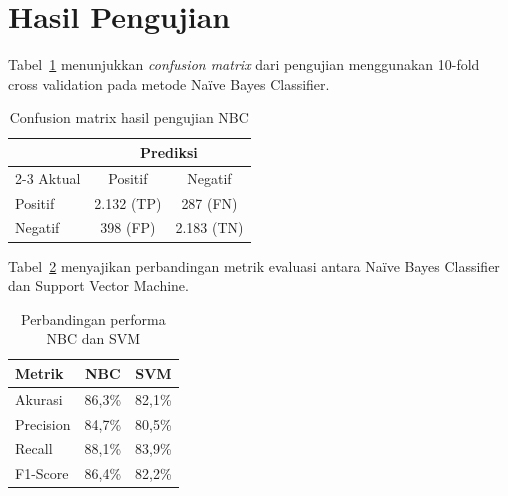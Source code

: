 \section{Hasil Pengujian}

Tabel~\ref{tab:confusion} menunjukkan \emph{confusion matrix} dari pengujian menggunakan 10-fold cross validation pada metode Na\"ive Bayes Classifier.

\begin{table}[H]
\centering
\caption{Confusion matrix hasil pengujian NBC}
\label{tab:confusion}
\begin{tabular}{@{}lcc@{}}
\toprule
 & \multicolumn{2}{c}{Prediksi} \\
\cmidrule{2-3}
Aktual & Positif & Negatif \\
\midrule
Positif & 2.132 (TP) & 287 (FN) \\
Negatif & 398 (FP) & 2.183 (TN) \\
\bottomrule
\end{tabular}
\end{table}

Tabel~\ref{tab:comparison} menyajikan perbandingan metrik evaluasi antara Na\"ive Bayes Classifier dan Support Vector Machine.

\begin{table}[H]
\centering
\caption{Perbandingan performa NBC dan SVM}
\label{tab:comparison}
\begin{tabular}{@{}lcc@{}}
\toprule
Metrik & NBC & SVM \\
\midrule
Akurasi & 86,3\% & 82,1\% \\
Precision & 84,7\% & 80,5\% \\
Recall & 88,1\% & 83,9\% \\
F1-Score & 86,4\% & 82,2\% \\
\bottomrule
\end{tabular}
\end{table}
